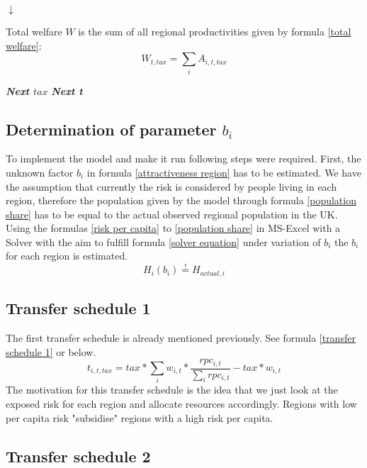 \documentclass[10pt,a4]{article}
\begin{document}
\begin{center}
\begin{center}
    $\downarrow$
\end{center}
Total welfare $W$ is the sum of all regional productivities given by formula \ref{total welfare}:
\begin{equation}
    W_{t,tax} = \sum_i A_{i,t,tax}
    \label{total welfare}
\end{equation}
\end{center}
\textbf{\textit{Next $tax$}}
\newline
\textbf{\textit{Next t}}

\subsection{Determination of parameter $b_i$}
To implement the model and make it run following steps were required.
First, the unknown factor $b_i$ in formula \ref{attractiveness region} has to be estimated. We have the assumption that currently the risk is considered by people living in each region, therefore the population given by the model through formula \ref{population share} has to be equal to the actual observed regional population in the UK. Using the formulas \ref{risk per capita} to \ref{population share} in MS-Excel with a Solver with the aim to fulfill formula \ref{solver equation} under variation of $b_i$ the $b_i$ for each region is estimated.
\begin{equation}
    H_i(b_i) \stackrel{!}{=}  H_{actual,i}
    \label{solver equation}
\end{equation}

\subsection{Transfer schedule 1}
The first transfer schedule is already mentioned previously. See formula \ref{transfer schedule 1} or below.
\begin{equation}
    t_{i,t,tax} = tax * \sum_i w_{i,t} * \frac{rpc_{i,t}}{\sum_i rpc_{i,t}} - tax * w_{i,t}
    \label{transfer schedule 1 again}
\end{equation}
The motivation for this transfer schedule is the idea that we just look at the exposed risk for each region and allocate resources accordingly. Regions with low per capita risk "subsidise" regions with a high risk per capita.

\subsection{Transfer schedule 2}
\end{document}
